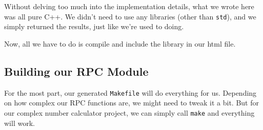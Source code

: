 \begin{Shaded}
\begin{Highlighting}[]
  \NormalTok{\}}
   
\NormalTok{\}}

\NormalTok{\}}
\NormalTok{\}}
\end{Highlighting}
\end{Shaded}

Without delving too much into the implementation details, what we wrote
here was all pure C++. We didn't need to use any libraries (other than
\texttt{std}), and we simply returned the results, just like we're used
to doing.

Now, all we have to do is compile and include the library in our html
file.

\subsection{Building our RPC Module}\label{building-our-rpc-module}

For the most part, our generated \texttt{Makefile} will do everything
for us. Depending on how complex our RPC functions are, we might need to
tweak it a bit. But for our complex number calculator project, we can
simply call \texttt{make} and everything will work.

\begin{Shaded}
\begin{Highlighting}[]
\end{Highlighting}
\end{Shaded}

\begin{Shaded}
\begin{Highlighting}[]
    
    
   
   
   
\end{Highlighting}
\end{Shaded}

